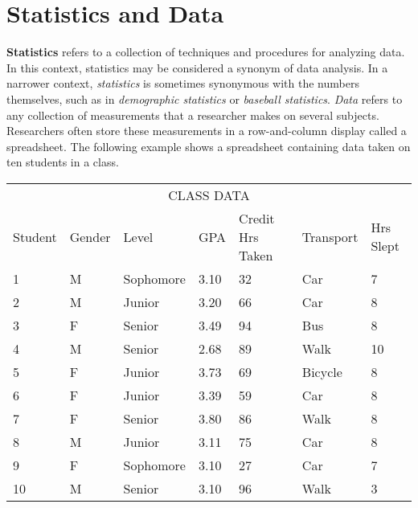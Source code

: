 \documentclass[11pt]{book}\usepackage[]{graphicx}\usepackage[]{color}
\begin{document}

\section{Statistics and Data}

\textbf{Statistics} refers to a collection of techniques and procedures for analyzing data.  In this context, statistics may be considered a synonym of data analysis.  In a narrower context, \textit{statistics} is sometimes synonymous with the numbers themselves, such as in \textit{demographic statistics} or \textit{baseball statistics}.  \textit{Data} refers to any collection of measurements that a researcher makes on several subjects.  Researchers often store these measurements in a row-and-column display called a spreadsheet.  The following example shows a spreadsheet containing data taken on ten students in a class.

  \begin{table}[htbp]
   \centering
  \begin{tabular}{@{} p{14mm} p{13mm} p{20mm} p{9mm} p{32mm} p{18mm} p{21mm} @{}} \hline %
   \multicolumn{7}{c}{CLASS DATA} \\
   Student & Gender & Level & GPA & Credit Hrs Taken & Transport & Hrs Slept \\ \hline
   1 & M & Sophomore & 3.10 & 32 & Car & 7 \\
   2 & M & Junior & 3.20 & 66 & Car & 8 \\
   3 & F & Senior & 3.49 & 94 & Bus & 8 \\
   4 & M & Senior & 2.68 & 89 & Walk & 10 \\
   5 & F & Junior & 3.73 & 69 & Bicycle & 8 \\
   6 & F & Junior & 3.39 & 59 & Car & 8 \\
   7 & F & Senior & 3.80 & 86 & Walk & 8 \\
   8 & M & Junior & 3.11 & 75 & Car & 8 \\
   9 & F & Sophomore & 3.10 & 27 & Car & 7 \\
   10 & M & Senior & 3.10 & 96 & Walk & 3 \\ \hline
   \end{tabular}
   \end{table}
\end{document}
